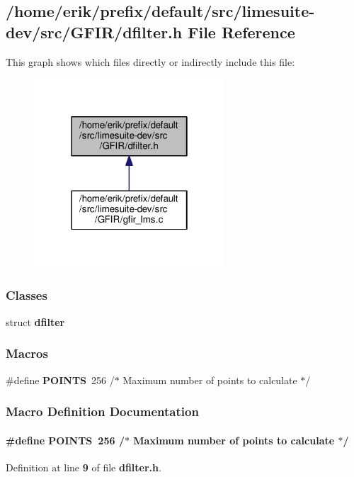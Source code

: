 \subsection{/home/erik/prefix/default/src/limesuite-\/dev/src/\+G\+F\+I\+R/dfilter.h File Reference}
\label{dfilter_8h}
This graph shows which files directly or indirectly include this file\+:
\nopagebreak
\begin{figure}[H]
\begin{center}
\leavevmode
\includegraphics[width=202pt]{d3/dd1/dfilter_8h__dep__incl}
\end{center}
\end{figure}
\subsubsection*{Classes}
\begin{DoxyCompactItemize}
\item 
struct {\bf dfilter}
\end{DoxyCompactItemize}
\subsubsection*{Macros}
\begin{DoxyCompactItemize}
\item 
\#define {\bf P\+O\+I\+N\+TS}~256	/$\ast$ Maximum number of points to calculate $\ast$/
\end{DoxyCompactItemize}


\subsubsection{Macro Definition Documentation}
\paragraph[{P\+O\+I\+N\+TS}]{\setlength{\rightskip}{0pt plus 5cm}\#define P\+O\+I\+N\+TS~256	/$\ast$ Maximum number of points to calculate $\ast$/}\label{dfilter_8h_ae6910994a90091fe877b021c590c894e}


Definition at line {\bf 9} of file {\bf dfilter.\+h}.

